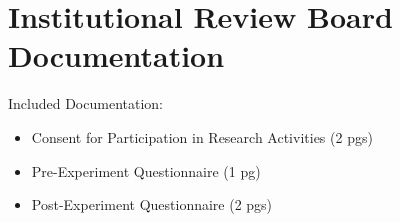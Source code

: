 \chapter{Institutional Review Board Documentation}
\label{app:IRB}
Included Documentation:
\begin{itemize}
  \item Consent for Participation in Research Activities (2 pgs)
  \item Pre-Experiment Questionnaire (1 pg)
  \item Post-Experiment Questionnaire (2 pgs)
\end{itemize}

\begin{center}
\end{center}
